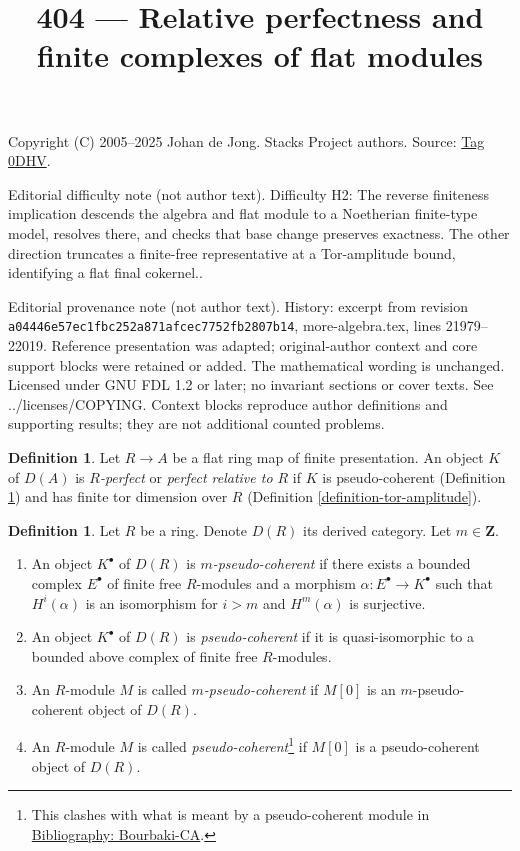 \documentclass{amsart}
\theoremstyle{plain}
\theoremstyle{definition}
\newtheorem{definition}[subsection]{Definition}
\theoremstyle{remark}
\numberwithin{equation}{subsection}
\begin{document}
\title[Stacks Project, Tag 0DHV]{404 --- Relative perfectness and finite complexes of flat modules}
\maketitle
\noindent Copyright (C) 2005--2025 Johan de Jong. Stacks Project authors. Source: \href{https://stacks.math.columbia.edu/tag/0DHV}{Tag 0DHV}.

\noindent Editorial difficulty note (not author text). Difficulty H2: The reverse finiteness implication descends the algebra and flat module to a Noetherian finite-type model, resolves there, and checks that base change preserves exactness. The other direction truncates a finite-free representative at a Tor-amplitude bound, identifying a flat final cokernel..

\noindent Editorial provenance note (not author text). History: excerpt from revision \texttt{a0444\allowbreak 6e57e\allowbreak c1fbc\allowbreak 252a8\allowbreak 71afc\allowbreak ec775\allowbreak 2fb28\allowbreak 07b14}, more-algebra.tex, lines 21979--22019. Reference presentation was adapted; original-author context and core support blocks were retained or added. The mathematical wording is unchanged. Licensed under GNU FDL 1.2 or later; no invariant sections or cover texts. See ../licenses/COPYING. Context blocks reproduce author definitions and supporting results; they are not additional counted problems.

\begin{definition}
\label{definition-relatively-perfect}
Let $R \to A$ be a flat ring map of finite presentation.
An object $K$ of $D(A)$ is {\it $R$-perfect} or {\it perfect relative to $R$}
if $K$ is pseudo-coherent
(Definition \ref{definition-pseudo-coherent})
and has finite tor dimension over $R$
(Definition \ref{definition-tor-amplitude}).
\end{definition}

\begin{definition}
\label{definition-pseudo-coherent}
Let $R$ be a ring. Denote $D(R)$ its derived category.
Let $m \in \mathbf{Z}$.
\begin{enumerate}
\item An object $K^\bullet$ of $D(R)$ is {\it $m$-pseudo-coherent}
if there exists a bounded complex $E^\bullet$ of finite free $R$-modules
and a morphism $\alpha : E^\bullet \to K^\bullet$ such that
$H^i(\alpha)$ is an isomorphism for $i > m$ and $H^m(\alpha)$
is surjective.
\item An object $K^\bullet$ of $D(R)$ is {\it pseudo-coherent}
if it is quasi-isomorphic to a bounded above complex of finite
free $R$-modules.
\item An $R$-module $M$ is called {\it $m$-pseudo-coherent}
if $M[0]$ is an $m$-pseudo-coherent object of $D(R)$.
\item An $R$-module $M$ is called
{\it pseudo-coherent}\footnote{This clashes with what is meant by
a pseudo-coherent module in \href{https://stacks.math.columbia.edu/bibliography}{Bibliography: Bourbaki-CA}.}
if $M[0]$ is a pseudo-coherent object of $D(R)$.
\end{enumerate}
\end{definition}
\end{document}
